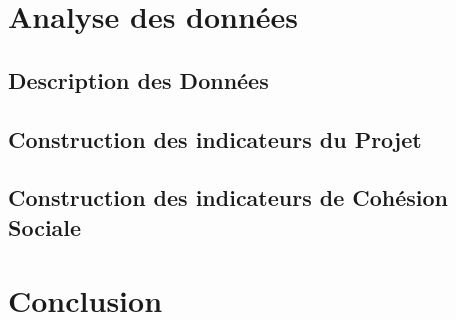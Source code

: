 \documentclass[
]{book}
\begin{document}
\hypertarget{analyse-des-donnuxe9es}{%
\chapter{Analyse des données}\label{analyse-des-donnuxe9es}}

\hypertarget{description-des-donnuxe9es}{%
\section{Description des Données}\label{description-des-donnuxe9es}}

\hypertarget{construction-des-indicateurs-du-projet}{%
\section{Construction des indicateurs du Projet}\label{construction-des-indicateurs-du-projet}}

\hypertarget{construction-des-indicateurs-de-cohuxe9sion-sociale}{%
\section{Construction des indicateurs de Cohésion Sociale}\label{construction-des-indicateurs-de-cohuxe9sion-sociale}}

\hypertarget{conclusion}{%
\chapter{Conclusion}\label{conclusion}}

  
\end{document}
